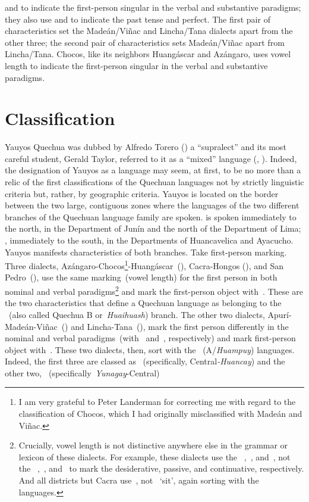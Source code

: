  and  to indicate the first-person singular in the verbal and substantive paradigms; they also use  and  to indicate the past tense and perfect. The first pair of characteristics set the Made\'an/Vi\~nac and Lincha/Tana dialects apart from the other three; the second pair of characteristics sets Made\'an/Vi\~nac apart from Lincha/Tana. Chocos, like its neighbors Huang\'ascar and Az\'angaro, uses vowel length to indicate the first-person singular in the verbal and substantive paradigms.

\section{Classification}\label{sec:classification}
Yauyos Quechua was dubbed by Alfredo Torero (\citeyear{Torero74}) a ``supralect'' and its most careful student, Gerald Taylor, referred to it as a ``mixed'' language (\citealt[2]{Taylor90}, \citealt[105]{Taylor00}). Indeed, the designation of Yauyos as a language may seem, at first, to be no more than a relic of the first classifications of the Quechuan languages not by strictly linguistic criteria but, rather, by geographic criteria. Yauyos is located on the border between the two large, contiguous zones where the languages of the two different branches of the Quechuan language family are spoken. \QI{} is spoken immediately to the north, in the Department of Jun\'in and the north of the Department of Lima; \QII{}, immediately to the south, in the Departments of Huancavelica and Ayacucho. Yauyos manifests characteristics of both branches. Take first-person marking. Three dialects, Az\'angaro-Chocos\footnote{I am very grateful to Peter Landerman for correcting me with regard to the classification of Chocos, which I had originally misclassified with Made\'an and Vi\~nac.}-Huang\'ascar~(\ACH{}), Cacra-Hongos (\CH{}), and San Pedro~(\SP{}), use the same marking~(vowel length) for the first person in both nominal and verbal paradigms\footnote{Crucially, vowel length is not distinctive anywhere else in the grammar or lexicon of these dialects. For example, these dialects use the \QII{}~,~, and~, not the \QI{}~,~, and~ to mark the desiderative, passive, and continuative, respectively. And all districts but Cacra use~, not~ `sit', again sorting with the \QII{} languages.} and mark the first-person object with~. These are the two characteristics that define a Quechuan language as belonging to the \QI{}~(also called Quechua B or~\textit{Huaihuash}) branch. The other two dialects, Apur\'i-Made\'an-Vi\~nac~(\AMV{}) and Lincha-Tana~(\LT{}), mark the first person differently in the nominal and verbal paradigms~(with~ and~, respectively) and mark first-person object with~. These two dialects, then, sort with the \QII{}~(A/\textit{Huampuy}) languages. Indeed, the first three are classed as \QI{}~(specifically, Central\textit{-Huancay}) and the other two, \QII{}~(specifically~\textit{Yunagay}-Central) 